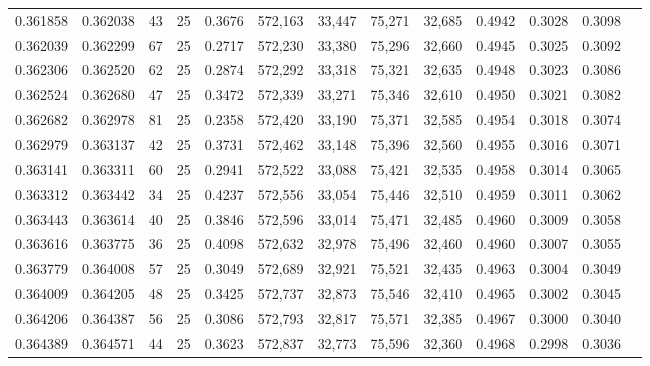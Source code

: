 \begin{tabular}{rrrrrrrrrrrrr}
0.361858 & 0.362038 &    43 &  25 &                                     0.3676 & 572,163 &  33,447 &  75,271 &  32,685 & 0.4942 & 0.3028 & 0.3098 \\
0.362039 & 0.362299 &    67 &  25 &                                     0.2717 & 572,230 &  33,380 &  75,296 &  32,660 & 0.4945 & 0.3025 & 0.3092 \\
0.362306 & 0.362520 &    62 &  25 &                                     0.2874 & 572,292 &  33,318 &  75,321 &  32,635 & 0.4948 & 0.3023 & 0.3086 \\
0.362524 & 0.362680 &    47 &  25 &                                     0.3472 & 572,339 &  33,271 &  75,346 &  32,610 & 0.4950 & 0.3021 & 0.3082 \\
0.362682 & 0.362978 &    81 &  25 &                                     0.2358 & 572,420 &  33,190 &  75,371 &  32,585 & 0.4954 & 0.3018 & 0.3074 \\
0.362979 & 0.363137 &    42 &  25 &                                     0.3731 & 572,462 &  33,148 &  75,396 &  32,560 & 0.4955 & 0.3016 & 0.3071 \\
0.363141 & 0.363311 &    60 &  25 &                                     0.2941 & 572,522 &  33,088 &  75,421 &  32,535 & 0.4958 & 0.3014 & 0.3065 \\
0.363312 & 0.363442 &    34 &  25 &                                     0.4237 & 572,556 &  33,054 &  75,446 &  32,510 & 0.4959 & 0.3011 & 0.3062 \\
0.363443 & 0.363614 &    40 &  25 &                                     0.3846 & 572,596 &  33,014 &  75,471 &  32,485 & 0.4960 & 0.3009 & 0.3058 \\
0.363616 & 0.363775 &    36 &  25 &                                     0.4098 & 572,632 &  32,978 &  75,496 &  32,460 & 0.4960 & 0.3007 & 0.3055 \\
0.363779 & 0.364008 &    57 &  25 &                                     0.3049 & 572,689 &  32,921 &  75,521 &  32,435 & 0.4963 & 0.3004 & 0.3049 \\
0.364009 & 0.364205 &    48 &  25 &                                     0.3425 & 572,737 &  32,873 &  75,546 &  32,410 & 0.4965 & 0.3002 & 0.3045 \\
0.364206 & 0.364387 &    56 &  25 &                                     0.3086 & 572,793 &  32,817 &  75,571 &  32,385 & 0.4967 & 0.3000 & 0.3040 \\
0.364389 & 0.364571 &    44 &  25 &                                     0.3623 & 572,837 &  32,773 &  75,596 &  32,360 & 0.4968 & 0.2998 & 0.3036 \\

\end{tabular}
